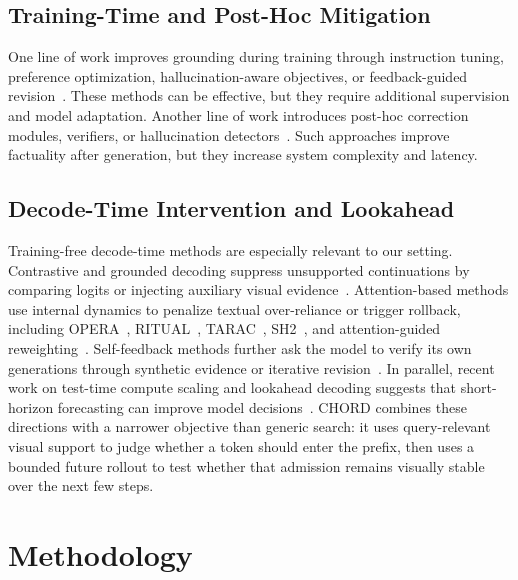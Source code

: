 \documentclass[sigconf,anonymous]{acmart}
\begin{document}
\subsection{Training-Time and Post-Hoc Mitigation}

One line of work improves grounding during training through instruction tuning, preference optimization, hallucination-aware objectives, or feedback-guided revision~\cite{liu2023aligning,chen2024hio,zhang2024reflective_instruction,lee2024volcano,yu2024rlhfv,sun2023llava_rlhf,peng2025sentinel}. These methods can be effective, but they require additional supervision and model adaptation. Another line of work introduces post-hoc correction modules, verifiers, or hallucination detectors~\cite{yin2023woodpecker,gunjal2024detecting_preventing,zhang2025dhcp,jing2023faithscore}. Such approaches improve factuality after generation, but they increase system complexity and latency.

\subsection{Decode-Time Intervention and Lookahead}

Training-free decode-time methods are especially relevant to our setting. Contrastive and grounded decoding suppress unsupported continuations by comparing logits or injecting auxiliary visual evidence~\cite{leng2023mitigating,favero2024m3id,deng2024clipguided,wang2024icd,chuang2023dola,jiang2024hacl,kim2024code}. Attention-based methods use internal dynamics to penalize textual over-reliance or trigger rollback, including OPERA~\cite{huang2024opera_cvpr}, RITUAL~\cite{woo2024ritual}, TARAC~\cite{xu2025tarac}, SH2~\cite{kai2024sh2}, and attention-guided reweighting~\cite{liu2024paying_attention_image}. Self-feedback methods further ask the model to verify its own generations through synthetic evidence or iterative revision~\cite{zhang2025degf,cao2025cofidec}. In parallel, recent work on test-time compute scaling and lookahead decoding suggests that short-horizon forecasting can improve model decisions~\cite{fu2024lookahead,gagrani2024speculative_mllm,gao2024cantor,cheng2025think_more}. CHORD combines these directions with a narrower objective than generic search: it uses query-relevant visual support to judge whether a token should enter the prefix, then uses a bounded future rollout to test whether that admission remains visually stable over the next few steps.

\section{Methodology}
\label{sec:Methodology}
\end{document}
